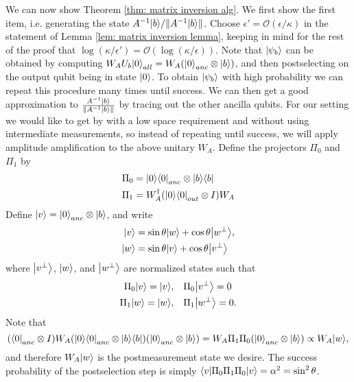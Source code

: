 \documentclass[11pt]{article}
\theoremstyle{definition}
\theoremstyle{remark}
\theoremstyle{definition}
\begin{document}
We can now show Theorem \ref{thm: matrix inversion alg}. We first show the first item, i.e. generating the state $A^{-1}{\left\vert{b}\right\rangle} / \|A^{-1}{\left\vert{b}\right\rangle}\|$. Choose $\epsilon' = \mathcal{O}(\epsilon/\kappa)$ in the statement of Lemma \ref{lem: matrix inversion lemma}, keeping in mind for the rest of the proof that $\log(\kappa/\epsilon') = \mathcal{O}(\log(\kappa/\epsilon))$. Note that ${\left\vert{\psi_b}\right\rangle}$ can be obtained by computing $W_AU_b{\left\vert{0}\right\rangle}_{all} = W_A ({\left\vert{0}\right\rangle}_{anc} \otimes {\left\vert{b}\right\rangle})$, and then postselecting on the output qubit being in state ${\left\vert{0}\right\rangle}$. To obtain ${\left\vert{\psi_b}\right\rangle}$ with high probability we can repeat this procedure many times until success. We can then get a good approximation to $\frac{A^{-1}{\left\vert{b}\right\rangle}} {\|A^{-1}{\left\vert{b}\right\rangle}\|} $ by tracing out the other ancilla qubits. For our setting we would like to get by with a low space requirement and without using intermediate measurements, so instead of repeating until success, we will apply amplitude amplification to the above unitary $W_A$. Define the projectors $\Pi_0$ and $\Pi_1$ by
\begin{align}
\Pi_0 &= {\left\vert{0}\right\rangle}{\left\langle{0}\right\vert}_{anc} \otimes {\left\vert{b}\right\rangle}{\left\langle{b}\right\vert} \\
\Pi_1 &= W_A^\dagger ({\left\vert{0}\right\rangle}{\left\langle{0}\right\vert}_{out} \otimes I) W_A
\end{align}
Define ${\left\vert{v}\right\rangle} = {\left\vert{0}\right\rangle}_{anc}\otimes {\left\vert{b}\right\rangle}$, and write
\begin{align}
{\left\vert{v}\right\rangle} &= \sin \theta {\left\vert{w}\right\rangle} +\cos \theta{\left\vert{w^\perp}\right\rangle}, \\
{\left\vert{w}\right\rangle} &= \sin \theta {\left\vert{v}\right\rangle} + \cos \theta{\left\vert{v^\perp}\right\rangle}
\end{align}
where ${\left\vert{v^\perp}\right\rangle}$, ${\left\vert{w}\right\rangle}$, and ${\left\vert{w^\perp}\right\rangle}$ are normalized states such that 
\begin{align}
\Pi_0{\left\vert{v}\right\rangle} = {\left\vert{v}\right\rangle},&\quad \Pi_0{\left\vert{v^\perp}\right\rangle} = 0 \\
\Pi_1{\left\vert{w}\right\rangle} = {\left\vert{w}\right\rangle},&\quad \Pi_1{\left\vert{w^\perp}\right\rangle} = 0.
\end{align}
Note that
\begin{equation} 
({\left\langle{0}\right\vert}_{anc} \otimes I) W_A ({\left\vert{0}\right\rangle}{\left\langle{0}\right\vert}_{anc} \otimes {\left\vert{b}\right\rangle}{\left\langle{b}\right\vert}) ({\left\vert{0}\right\rangle}_{anc} \otimes {\left\vert{b}\right\rangle}) = W_A \Pi_1\Pi_0({\left\vert{0}\right\rangle}_{anc} \otimes {\left\vert{b}\right\rangle}) \propto W_A {\left\vert{w}\right\rangle},
\end{equation}
and therefore $W_A{\left\vert{w}\right\rangle}$ is the postmeasurement state we desire. The success probability of the postselection step is simply ${\left\langle{v}\right\vert}\Pi_0\Pi_1\Pi_0{\left\vert{v}\right\rangle} = \alpha^2 = \sin^2\theta$. 
\end{document}
